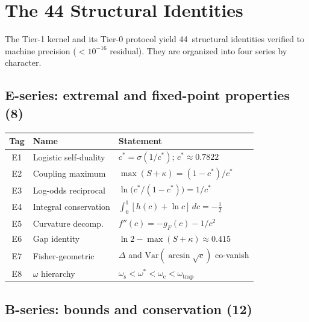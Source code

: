 \documentclass[
  aps,
  prd,
  twocolumn,
  superscriptaddress,
  nofootinbib,
  floatfix
]{revtex4-2}
\newcommand{\gF}{g_{\!F}}
\begin{document}
\section{The 44 Structural Identities}\label{sec:identities}

The Tier-1 kernel and its Tier-0 protocol yield 44~structural
identities verified to machine precision
($< 10^{-16}$ residual).
They are organized into four series by character.

\subsection{E-series: extremal and fixed-point properties (8)}

\begin{center}
{\small\begin{tabular}{@{}clp{4.2cm}@{}}
\toprule
\textbf{Tag} & \textbf{Name} & \textbf{Statement} \\
\midrule
E1 & Logistic self-duality & $c^* = \sigma(1/c^*)$; $c^* \approx 0.7822$ \\
E2 & Coupling maximum & $\max(S{+}\kappa) = (1{-}c^*)/c^*$ \\
E3 & Log-odds reciprocal & $\ln\!\bigl(c^*/(1{-}c^*)\bigr) = 1/c^*$ \\
E4 & Integral conservation & $\int_0^1 [h(c){+}\ln c]\,dc = -\tfrac{1}{2}$ \\
E5 & Curvature decomp.\ & $f''(c) = -\gF(c) - 1/c^2$ \\
E6 & Gap identity & $\ln 2 - \max(S{+}\kappa) \approx 0.415$ \\
E7 & Fisher-geometric & $\Delta$ and $\mathrm{Var}(\arcsin\sqrt{c})$ co-vanish \\
E8 & $\omega$ hierarchy & $\omega_\mathrm{s} < \omega^* < \omega_\mathrm{c} < \omega_\mathrm{trap}$ \\
\bottomrule
\end{tabular}}
\end{center}

\subsection{B-series: bounds and conservation (12)}
\end{document}
